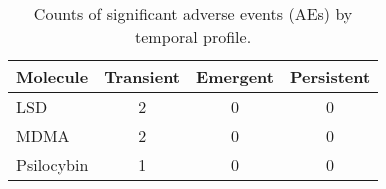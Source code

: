 \begin{table}[htbp]
  \centering
  \caption{Counts of significant adverse events (AEs) by temporal profile.}
  \label{tab:forest-ae-sig-counts}
  \begin{tabular}{lccc}
    \toprule
    Molecule & Transient & Emergent & Persistent \\
    \midrule
    LSD & 2 & 0 & 0 \\
    MDMA & 2 & 0 & 0 \\
    Psilocybin & 1 & 0 & 0 \\
    \bottomrule
  \end{tabular}
\end{table}
